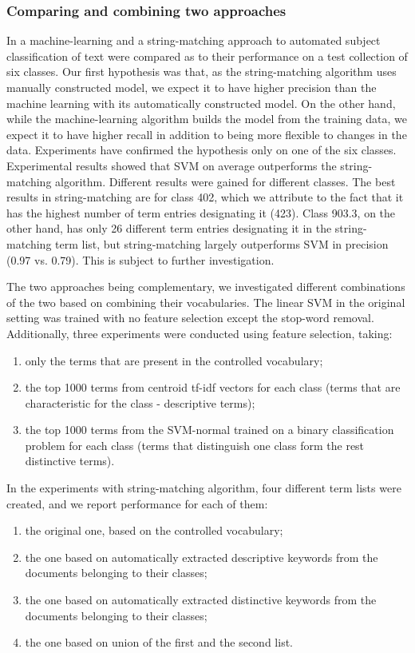 \subsubsection{Comparing and combining two approaches}
In \cite{ardo06:_ECDL} a machine-learning and a string-matching approach to automated subject classification of text were compared as to their performance on a test collection of six classes. Our first hypothesis was that, as the string-matching algorithm uses manually constructed model, we expect it to have higher precision than the machine learning with its automatically constructed model. On the other hand, while the machine-learning algorithm builds the model from the training data, we expect it to have higher recall in addition to being more flexible to changes in the data. Experiments have confirmed the hypothesis only on one of the six classes. Experimental results showed that SVM on average outperforms the string-matching algorithm. Different results were gained for different classes. The best results in string-matching are for class 402, which we attribute to the fact that it has the highest number of term entries designating it (423). Class 903.3, on
the other hand, has only 26 different term entries designating it in the string-matching term list, but string-matching largely outperforms SVM in precision (0.97 vs. 0.79). This is subject to further investigation.

The two approaches being complementary, we investigated different combinations of the two based on combining their vocabularies. 
The linear SVM in the original setting was trained with no feature selection except the stop-word removal. Additionally, three experiments were conducted using feature selection, taking:
\begin{enumerate}
\item only the terms that are present in the controlled vocabulary;
\item the top 1000 terms from centroid tf-idf vectors for each class (terms that are characteristic for the class - descriptive terms);
\item the top 1000 terms from the SVM-normal trained on a binary classification problem for each class (terms that distinguish one class form the rest distinctive terms).
\end{enumerate}

In the experiments with string-matching algorithm, four different term lists were created, and we report performance for each of them:
\begin{enumerate}
\item the original one, based on the controlled vocabulary;
\item the one based on automatically extracted descriptive keywords from the documents belonging to their classes;
\item the one based on automatically extracted distinctive keywords from the documents belonging to their classes;
\item the one based on union of the first and the second list.
\end{enumerate}

